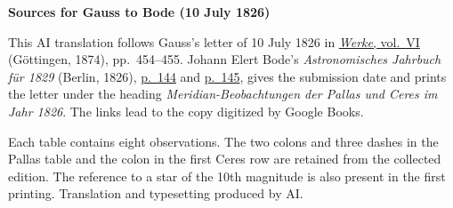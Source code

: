 \clearpage\thispagestyle{empty}
\begin{center}\textbf{Sources for Gauss to Bode (10 July 1826)}\end{center}
\noindent This AI translation follows Gauss’s letter of 10 July 1826 in \href{https://gdz.sub.uni-goettingen.de/id/PPN236007467}{\textit{Werke}, vol.~VI} (Göttingen, 1874), pp.~454--455. Johann Elert Bode’s \textit{Astronomisches Jahrbuch für 1829} (Berlin, 1826), \href{https://books.google.nl/books?id=LxwPAAAAQAAJ&pg=PA144&redir_esc=y}{p.~144} and \href{https://books.google.nl/books?id=LxwPAAAAQAAJ&pg=PA145&redir_esc=y}{p.~145}, gives the submission date and prints the letter under the heading \textit{Meridian-Beobachtungen der Pallas und Ceres im Jahr 1826}. The links lead to the copy digitized by Google Books.
\par\smallskip\noindent Each table contains eight observations. The two colons and three dashes in the Pallas table and the colon in the first Ceres row are retained from the collected edition. The reference to a star of the 10th magnitude is also present in the first printing. Translation and typesetting produced by AI.
\clearpage

